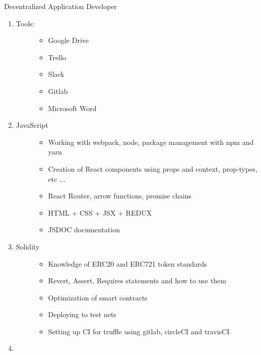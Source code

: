 Decentralized Application Developer

\begin{enumerate}
\def\labelenumi{\arabic{enumi}.}
\item
  \begin{description}
  \item[Tools:]
  \begin{itemize}
  \tightlist
  \item
    Google Drive
  \item
    Trello
  \item
    Slack
  \item
    Gitlab
  \item
    Microsoft Word
  \end{itemize}
  \end{description}
\item
  \begin{description}
  \item[JavaScript]
  \begin{itemize}
  \tightlist
  \item
    Working with webpack, node, package management with npm and yarn
  \item
    Creation of React components using props and context, prop-types,
    etc ...
  \item
    React Router, arrow functions, promise chains
  \item
    HTML + CSS + JSX + REDUX
  \item
    JSDOC documentation
  \end{itemize}
  \end{description}
\item
  \begin{description}
  \item[Solidity]
  \begin{itemize}
  \tightlist
  \item
    Knowledge of ERC20 and ERC721 token standards
  \item
    Revert, Assert, Requires statements and how to use them
  \item
    Optimization of smart contracts
  \item
    Deploying to test nets
  \item
    Setting up CI for truffle using gitlab, circleCI and travisCI
  \end{itemize}
  \end{description}
\item
  \begin{description}

\end{description}
\end{enumerate}
